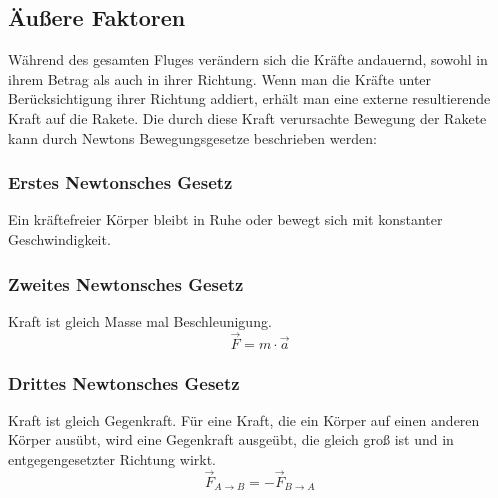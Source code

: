 \subsection{Äußere Faktoren}
\label{subsec:external_factors}
Während des gesamten Fluges verändern sich die Kräfte andauernd, sowohl in ihrem Betrag als auch in ihrer Richtung. Wenn man die Kräfte unter Berücksichtigung ihrer Richtung addiert, erhält man eine externe resultierende Kraft auf die Rakete. Die durch diese Kraft verursachte Bewegung der Rakete kann durch Newtons Bewegungsgesetze beschrieben werden: \cite{BeginnersGuideToAeronautics}
\subsubsection{Erstes Newtonsches Gesetz}
\label{subsubsec:first_newton_law}
Ein kräftefreier Körper bleibt in Ruhe oder bewegt sich mit konstanter Geschwindigkeit.

\subsubsection{Zweites Newtonsches Gesetz}
\label{subsubsec:second_newton_law}
Kraft ist gleich Masse mal Beschleunigung.
\begin{equation}
    \vec{F} = m \cdot \vec{a}
\end{equation}

\subsubsection{Drittes Newtonsches Gesetz}
\label{subsubsec:third_newton_law}
Kraft ist gleich Gegenkraft. Für eine Kraft, die ein Körper auf einen anderen Körper ausübt, wird eine Gegenkraft ausgeübt, die gleich groß ist und in entgegengesetzter Richtung wirkt.
\begin{equation}
    \vec{F}_{A\rightarrow B} = - \vec{F}_{B\rightarrow A}
\end{equation}


